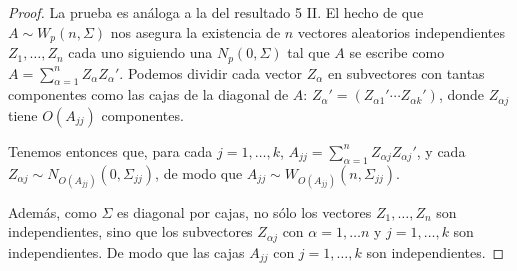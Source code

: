 \documentclass[12pt,spanish]{article}
\theoremstyle{definition}
\begin{document}
\begin{proof}
  La prueba es análoga a la del resultado 5 II. El hecho de que
  $A\sim W_p(n,\Sigma)$ nos asegura la existencia de $n$ vectores
  aleatorios independientes $Z_1,\ldots, Z_n$ cada uno siguiendo una
  $N_p(0,\Sigma)$ tal que $A$ se escribe como
  $A=\sum\limits_{\alpha=1}^n Z_\alpha Z_\alpha'$. Podemos dividir
  cada vector $Z_\alpha$ en subvectores con tantas componentes como
  las cajas de la diagonal de $A$:
  $Z_\alpha'=(Z_{\alpha 1}' \cdots Z_{\alpha k}')$, donde
  $Z_{\alpha j}$ tiene $O(A_{jj})$ componentes.

  Tenemos entonces que, para cada $j=1,\ldots, k$,
  $A_{jj}=\sum\limits_{\alpha=1}^n Z_{\alpha j} Z_{\alpha j}'$, y cada
  $Z_{\alpha j}\sim N_{O(A_{jj})}(0,\Sigma_{jj})$, de modo que
  $A_{jj}\sim W_{O(A_{jj})}(n,\Sigma_{jj})$.

  Además, como $\Sigma$ es diagonal por cajas, no sólo los vectores
  $Z_1,\ldots,Z_n$ son independientes, sino que los subvectores
  $Z_{\alpha j}$ con $\alpha=1,\ldots n$ y $j=1,\ldots, k$ son
  independientes. De modo que las cajas $A_{jj}$ con $j=1,\ldots, k$
  son independientes.
\end{proof}
\end{document}
